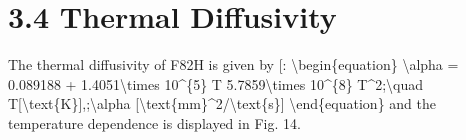 \documentclass[letterpaper,10pt,english]{jupyterBook}
\begin{document}
	
	\section{3.4 Thermal Diffusivity}
	\label{\detokenize{3 Thermophysical Properties:thermal-diffusivity}}
	\sphinxAtStartPar
	The thermal diffusivity of F82H is given by {[}\sphinxhref{https://drive.google.com/file/d/1EAKnctMi6BqWtE4DrxCDe5L8niCH0WDe/view?usp=drive\_link}{TavassoliRensman2002}{]}:
	\textbackslash{}begin\{equation\}
	\textbackslash{}alpha = 0.089188 + 1.4051\textbackslash{}times 10\textasciicircum{}\{\sphinxhyphen{}5\} T \sphinxhyphen{} 5.7859\textbackslash{}times 10\textasciicircum{}\{\sphinxhyphen{}8\} T\textasciicircum{}2;\textbackslash{}quad T{[}\textbackslash{}text\{K\}{]},;\textbackslash{}alpha {[}\textbackslash{}text\{mm\}\textasciicircum{}2/\textbackslash{}text\{s\}{]}
	\textbackslash{}end\{equation\}
	and the temperature dependence is displayed in Fig. 14.
	
\end{document}
